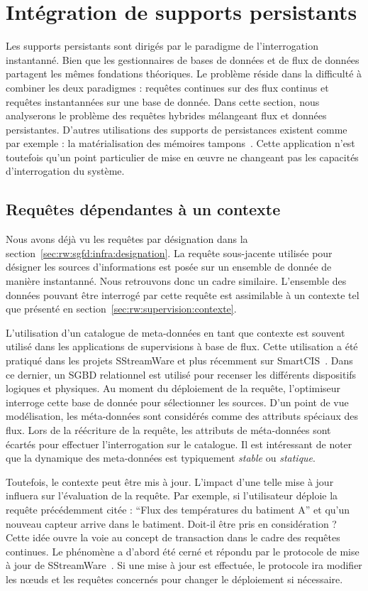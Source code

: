 \section{Intégration de supports persistants}\label{sec:rw:sgfd:persistance}
Les supports persistants sont dirigés par le paradigme de l'interrogation instantanné. Bien que les gestionnaires de bases de données et de flux de données partagent les mêmes fondations théoriques. Le problème réside dans la difficulté à combiner les deux paradigmes : requêtes continues sur des flux continus et requêtes instantannées sur une base de donnée. Dans cette section, nous analyserons le problème des requêtes hybrides mélangeant flux et données persistantes. D'autres utilisations des supports de persistances existent comme par exemple : la matérialisation des mémoires tampons~\cite{Abadi:aurora}. Cette application n'est toutefois qu'un point particulier de mise en œuvre ne changeant pas les capacités d'interrogation du système.

\subsection{Requêtes dépendantes à un contexte}
Nous avons déjà vu les requêtes par désignation dans la section~\ref{sec:rw:sgfd:infra:designation}. La requête sous-jacente utilisée pour désigner les sources d'informations est posée sur un ensemble de donnée de manière instantanné. Nous retrouvons donc un cadre similaire. L'ensemble des données pouvant être interrogé par cette requête est assimilable à un contexte tel que présenté en section~\ref{sec:rw:supervision:contexte}.

L'utilisation d'un catalogue de meta-données en tant que contexte est souvent utilisé dans les applications de supervisions à base de flux. Cette utilisation a été pratiqué dans les projets SStreamWare et plus récemment sur SmartCIS~\cite{Liu:smartcis}. Dans ce dernier, un SGBD relationnel est utilisé pour recenser les différents dispositifs logiques et physiques. Au moment du déploiement de la requête, l'optimiseur interroge cette base de donnée pour sélectionner les sources. D'un point de vue modélisation, les méta-données sont considérés comme des attributs spéciaux des flux. Lors de la réécriture de la requête, les attributs de méta-données sont écartés pour effectuer l'interrogation sur le catalogue. Il est intéressant de noter que la dynamique des meta-données est typiquement \textit{stable} ou \textit{statique}.

Toutefois, le contexte peut être mis à jour. L'impact d'une telle mise à jour influera sur l'évaluation de la requête. Par exemple, si l'utilisateur déploie la requête précédemment citée : \enquote{Flux des températures du batiment A} et qu'un nouveau capteur arrive dans le batiment. Doit-il être pris en considération ? Cette idée ouvre la voie au concept de transaction dans le cadre des requêtes continues. Le phénomène a d'abord été cerné et répondu par le protocole de mise à jour de SStreamWare~\cite{Gurgen:transaction}. Si une mise à jour est effectuée, le protocole ira modifier les nœuds et les requêtes concernés pour changer le déploiement si nécessaire.


